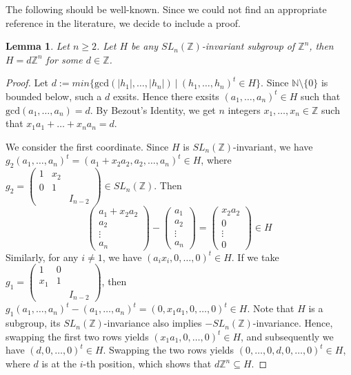 \documentclass[12pt]{amsart}
\newtheorem{lem}[theorem]{Lemma}
\theoremstyle{definition}
\theoremstyle{remark}
\begin{document}
The following should be well-known. Since we could not find an appropriate reference in the literature, we decide to include a proof. 
\begin{lem}\label{lem: invariant subgroups in Zn} Let $n\geq 2$. Let $H$ be any $SL_{n}(\mathbb{Z})$-invariant subgroup of $\mathbb{Z}^n$, then $H = d\mathbb{Z}^n$ for some $d\in \mathbb{Z}$. \end{lem}
\begin{proof}

Let $d:=min\{\text{gcd}(\left|h_1\right|,\ldots,\left|h_n\right|)~|~ (h_1,\ldots,h_n)^t \in H\}$. Since $\mathbb{N}\setminus\{0\}$ is bounded below, such a $d$ exsits. Hence there exsits $(a_1,\dots,a_n)^t\in H$ such that $\text{gcd}(a_1,\dots,a_n)=d$. By Bezout’s Identity, we get $n$ integers $x_1,\dots,x_n\in \mathbb{Z}$ such that $x_1a_1+\dots+x_na_n = d$.

We consider the first coordinate. Since $H$ is $SL_{n}(\mathbb{Z})$-invariant, we have $g_2(a_1,\dots,a_n)^t = (a_1+x_2a_2,a_2,\dots,a_n)^t \in H$, where $g_2= \left(\begin{smallmatrix}
     1 & x_2 \\
     0 & 1 \\
     & & I_{n-2}
   \end{smallmatrix}\right)\in SL_{n}(\mathbb{Z})$. Then \begin{equation*}
      \left(\begin{smallmatrix}
           a_1+x_2a_2\\
           a_2\\
           \vdots\\
           a_n
       \end{smallmatrix}\right)-\left(\begin{smallmatrix}
            a_1\\
           a_2\\
           \vdots\\
           a_n
\end{smallmatrix}\right)=\left(\begin{smallmatrix}
            x_2a_2\\
           0\\
           \vdots\\
           0
       \end{smallmatrix}\right)\in H
   \end{equation*}
Similarly, for any $i\ne 1$, we have $(a_ix_i,0,\dots,0)^t \in H$. If we take $g_1= \left(\begin{smallmatrix}
     1 & 0 \\
     x_1 & 1 \\
     & & I_{n-2}
     \end{smallmatrix}\right)$, then $g_1(a_1,\dots,a_n)^t-(a_1,\dots,a_n)^t=(0,x_1a_1,0,\dots,0)^t \in H$. Note that $H$ is a subgroup, its $SL_{n}(\mathbb{Z})$-invariance also implies $-SL_{n}(\mathbb{Z})$-invariance. Hence, swapping the first two rows yields $(x_1a_1,0,\dots,0)^t\in H$, and subsequently we have $(d,0,\dots,0)^t \in H$. Swapping the two rows yields $(0,\dots,0,d,0,\dots,0)^t\in H$, where $d$ is at the $i$-th position, which shows that $d\mathbb{Z}^n \subseteq H$.


\end{proof}
\end{document}
